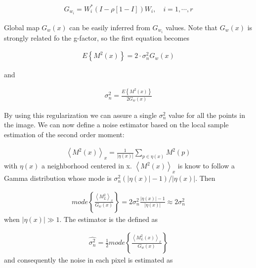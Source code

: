 \begin{equation}
\begin{aligned}G_{w_{i}}=W_{i}^{*}\left(I-\rho\left[1-I\right]\right)W_{i},\quad i=1,\cdots,r\end{aligned}
\end{equation}

Global map $G_{w}(x)$ can be easily inferred from $G_{w_{i}}$ values.
Note that $G_{w}(x)$ is strongly related fo the g-factor, so the
first equation becomes

\begin{equation}
\begin{aligned}E\left\{ M^{2}\left(x\right)\right\} =2\cdot\sigma_{n}^{2}G_{w}\left(x\right)\end{aligned}
\end{equation}

and

\begin{equation}
\begin{aligned}\sigma_{n}^{2}=\frac{E\left\{ M^{2}\left(x\right)\right\} }{2G_{w}\left(x\right)}\end{aligned}
\end{equation}

By using this regularization we can assure a single $\sigma_{n}^{2}$
value for all the points in the image. We can now define a noise estimator
based on the local sample estimation of the second order moment:

\begin{equation}
\begin{aligned}\left\langle M^{2}(x)\right\rangle _{x}=\frac{1}{\left|\eta(x)\right|}\sum_{p\in\eta(x)}M^{2}(p)\end{aligned}
\end{equation}
with $\eta(x)$ a neighborhood centered in x. $\left\langle M^{2}(x)\right\rangle _{x}$
is know to follow a Gamma distribution whose mode is $\sigma_{n}^{2}(\left|\eta(x)\right|-1)/\left|\eta(x)\right|$.
Then

\begin{equation}
\begin{aligned}mode\left\{ \frac{\left\langle M_{L}^{2}\right\rangle _{x}}{G_{w}(x)}\right\} =2\sigma_{n}^{2}\frac{\left|\eta(x)\right|-1}{\left|\eta(x)\right|}\approx2\sigma_{n}^{2}\end{aligned}
\end{equation}
when $\left|\eta(x)\right|\gg1$. The estimator is the defined as

\begin{equation}
\begin{aligned}\widehat{\sigma_{n}^{2}}=\frac{1}{2}mode\left\{ \frac{\left\langle M_{L}^{2}(x)\right\rangle _{x}}{G_{w}(x)}\right\} \end{aligned}
\end{equation}
and consequently the noise in each pixel is estimated as

